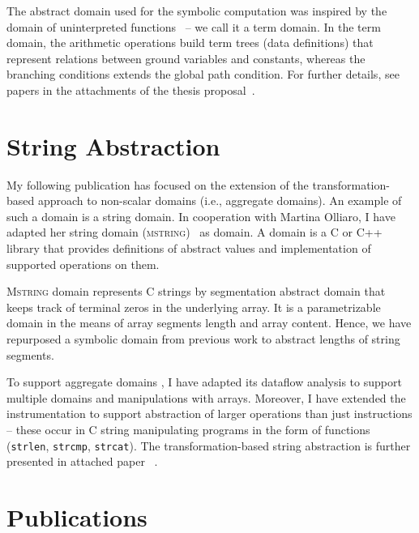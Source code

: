 The abstract domain used for the symbolic computation was inspired by the
domain of uninterpreted functions~\cite{Gange2016} -- we call it a term domain.
In the term domain, the arithmetic operations build term trees (data
definitions) that represent relations between ground variables and constants,
whereas the branching conditions extends the global path condition.  For
further details, see papers in the attachments of the thesis
proposal~\cite{Lauko2018SymComp, Lauko2019Sym}.

\section{String Abstraction}
\label{sec:string}

My following publication has focused on the extension of the
transformation-based approach to non-scalar domains (i.e., aggregate domains).
An example of such a domain is a string domain. In cooperation with Martina
Olliaro, I have adapted her string domain (\textsc{mstring})~\cite{Olliaro2018}
as \lart domain. A \lart domain is a C or C++ library that provides
definitions of abstract values and implementation of supported operations on
them.

\textsc{Mstring} domain represents C strings by segmentation abstract domain
that keeps track of terminal zeros in the underlying array. It is a
parametrizable domain in the means of array segments length and array
content.  Hence, we have repurposed a symbolic domain from previous work to
abstract lengths of string segments.

To support aggregate domains \lart, I have adapted its data\-flow analysis to
support multiple domains and manipulations with \llvm arrays. Moreover, I have
extended the instrumentation to support abstraction of larger operations than
just \llvm instructions -- these occur in C string manipulating programs in the
form of functions (\texttt{strlen}, \texttt{strcmp}, \texttt{strcat}). The
transformation-based string abstraction is further presented in attached paper
~\cite{Lauko2019String}.

\section{Publications}
\label{sec:publications}

